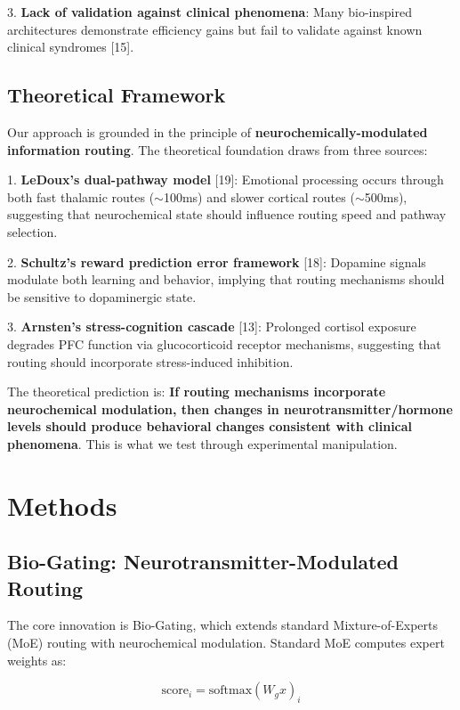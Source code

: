 \documentclass[10pt,a4paper]{article}
\begin{document}
3. \textbf{Lack of validation against clinical phenomena}: Many bio-inspired architectures demonstrate efficiency gains but fail to validate against known clinical syndromes [15].

\subsection{Theoretical Framework}

Our approach is grounded in the principle of \textbf{neurochemically-modulated information routing}. The theoretical foundation draws from three sources:

1. \textbf{LeDoux's dual-pathway model} [19]: Emotional processing occurs through both fast thalamic routes ($\sim$100ms) and slower cortical routes ($\sim$500ms), suggesting that neurochemical state should influence routing speed and pathway selection.

2. \textbf{Schultz's reward prediction error framework} [18]: Dopamine signals modulate both learning and behavior, implying that routing mechanisms should be sensitive to dopaminergic state.

3. \textbf{Arnsten's stress-cognition cascade} [13]: Prolonged cortisol exposure degrades PFC function via glucocorticoid receptor mechanisms, suggesting that routing should incorporate stress-induced inhibition.

The theoretical prediction is: \textbf{If routing mechanisms incorporate neurochemical modulation, then changes in neurotransmitter/hormone levels should produce behavioral changes consistent with clinical phenomena}. This is what we test through experimental manipulation.

\section{Methods}

\subsection{Bio-Gating: Neurotransmitter-Modulated Routing}

The core innovation is Bio-Gating, which extends standard Mixture-of-Experts (MoE) routing with neurochemical modulation. Standard MoE computes expert weights as:

\begin{equation}
\text{score}_i = \text{softmax}(W_g x)_i
\end{equation}
\end{document}
